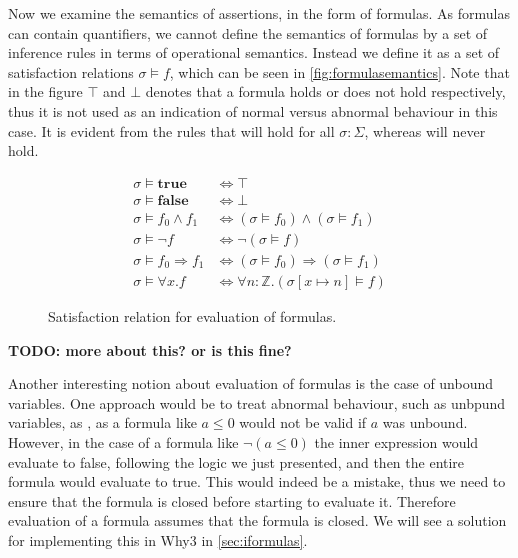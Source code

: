 Now we examine the semantics of assertions, in the form of formulas.
As formulas can contain quantifiers, we cannot define the semantics of formulas by a set
of inference rules in terms of operational semantics.
Instead we define it as a set of satisfaction relations $\sigma \vDash f$, which can be seen in \autoref{fig:formulasemantics}.
Note that in the figure $\top$ and $\bot$ denotes that a formula holds or does not hold
respectively, thus it is not used as an indication of normal versus abnormal behaviour
in this case.
It is evident from the rules that  will hold for all $\sigma: \Sigma$,
whereas  will never hold.

\begin{figure}[h!]
  \begin{align*}
    \sigma \vDash \mathbf{true} &\Longleftrightarrow \top \\
    \sigma \vDash \mathbf{false} &\Longleftrightarrow \bot \\
    \sigma \vDash f_{0} \land f_{1} &\Longleftrightarrow
           (\sigma \vDash f_{0}) \land (\sigma \vDash f_{1}) \\
    \sigma \vDash \neg f &\Longleftrightarrow \neg (\sigma \vDash f) \\
    \sigma \vDash f_{0} \Rightarrow f_{1} &\Longleftrightarrow
           (\sigma \vDash f_{0}) \Rightarrow (\sigma \vDash f_{1}) \\
    \sigma \vDash \forall x.f &\Longleftrightarrow
                                \forall n:\mathbb{Z}. (\sigma [x \mapsto n] \vDash f)
  \end{align*}
\caption{Satisfaction relation for evaluation of formulas.}
\label{fig:formulasemantics}
\end{figure}

\textbf{TODO: more about this? or is this fine?}


Another interesting notion about evaluation of formulas is the case of unbound variables.
One approach would be to treat abnormal behaviour, such as unbpund variables, as ,
as a formula like $a \leq 0$ would not be valid if $a$ was unbound.
However, in the case of a formula like $\neg (a \leq 0)$ the inner expression would evaluate to
false, following the logic we just presented, and then the entire formula would evaluate to
true. This would indeed be a mistake, thus we need to ensure that the formula is closed before
starting to evaluate it. Therefore evaluation of a formula assumes that the formula is closed.
We will see a solution for implementing this in Why3 in \ref{sec:iformulas}.
